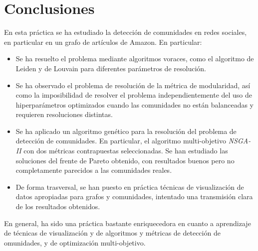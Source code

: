 \section{Conclusiones}
En esta práctica se ha estudiado la detección de comunidades en redes sociales,
en particular en un grafo de artículos de Amazon. En particular:

\begin{itemize}
  \item Se ha resuelto el problema mediante algoritmos voraces, como el
    algoritmo de Leiden y de Louvain para diferentes parámetros de resolución.
  \item Se ha observado el problema de resolución de la métrica de modularidad,
    así como la imposibilidad de resolver el problema independientemente del
    uso de hiperparámetros optimizados cuando las comunidades no están balanceadas
    y requieren resoluciones distintas.
  \item Se ha aplicado un algoritmo genético para la resolución del problema de
    detección de comunidades. En particular, el algoritmo multi-objetivo
    \emph{NSGA-II} con dos métricas contrapuestas seleccionadas. Se han
    estudiado las soluciones del frente de Pareto obtenido, con resultados
    buenos pero no completamente parecidos a las comunidades reales.
  \item De forma trasversal, se han puesto en práctica técnicas de visualización
    de datos apropiadas para grafos y comunidades, intentado una transmisión
    clara de los resultados obtenidos.
\end{itemize}

En general, ha sido una práctica bastante enriquecedora en cuanto a aprendizaje
de técnicas de visualización y de algoritmos y métricas de detección de
omunidades, y de optimización multi-objetivo.



